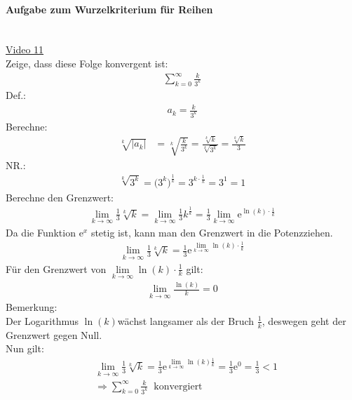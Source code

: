 \paragraph{Aufgabe zum Wurzelkriterium für Reihen}$  $\vspace*{3mm}\\
\href{https://youtu.be/Z95Uw9OgMck}{Video 11}\\
Zeige, dass diese Folge konvergent ist:\\
\begin{align*}
\sum\limits_{k=0}^{\infty}\frac{k}{3^k}
\end{align*}
Def.:\\
\begin{align*}
a_k=\frac{k}{3^k}
\end{align*}
Berechne:\\
\begin{align*}
\sqrt[k]{|a_k|}&=\sqrt[k]{\frac{k}{3^k}}=\frac{\sqrt[k]{k}}{\sqrt[k]{3^k}}=\frac{\sqrt[k]{k}}{3}
\end{align*}
NR.:\\
\begin{align*}
\sqrt[k]{3^k}=\big(3^k\big)^{\frac{1}{k}}=3^{k\cdot\frac{1}{k}}=3^1=1
\end{align*}
Berechne den Grenzwert:\\
\begin{align*}
\lim\limits_ {k\to\infty}\frac{1}{3}\sqrt[k]{k}=\lim\limits_ {k\to\infty}\frac{1}{3}k^{\frac{1}{k}}=\frac{1}{3}\lim\limits_ {k\to\infty}\mathrm{e}^{\ln(k)\cdot\frac{1}{k}}
\end{align*}
Da die Funktion $ \mathrm{e}^x $ stetig ist, kann man den Grenzwert in die \glqq Potenz\grqq  ziehen.\\
\begin{align*}
\lim\limits_ {k\to\infty}\frac{1}{3}\sqrt[k]{k}=\frac{1}{3}\mathrm{e}^{\lim\limits_ {k\to\infty}\ln(k)\cdot\frac{1}{k}}
\end{align*}
Für den Grenzwert von $\lim\limits_ {k\to\infty}\ln(k)\cdot\frac{1}{k} $ gilt:\\
\begin{align*}
\lim\limits_ {k\to\infty}\frac{\ln(k)}{k}=0
\end{align*}
Bemerkung:\\
Der Logarithmus $ \ln(k) $wächst langsamer als der Bruch $ \frac{1}{k} $, deswegen geht der Grenzwert gegen Null.\\
Nun gilt:\\
\begin{align*}
&\lim\limits_ {k\to\infty}\frac{1}{3}\sqrt[k]{k}=\frac{1}{3}\mathrm{e}^{\lim\limits_ {k\to\infty}\ln(k)\frac{1}{k}}=\frac{1}{3}\mathrm{e}^0=\frac{1}{3}<1\\
&\Rightarrow \sum\limits_{k=0}^{\infty}\frac{k}{3^k}\;\;\text{konvergiert}
\end{align*}
